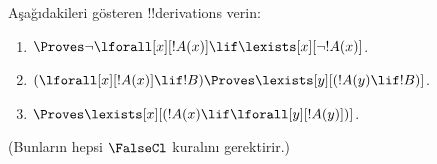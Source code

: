 \begin{prob}
Aşağıdakileri gösteren !!{derivation}s verin:
\begin{enumerate}
\item $\Proves \lnot\lforall[x][!A(x)] \lif \lexists[x][\lnot!A(x)]$.
\item $(\lforall[x][!A(x)] \lif !B) \Proves \lexists[y][(!A(y) \lif !B)]$.
\item $\Proves \lexists[x][(!A(x) \lif \lforall[y][!A(y)])]$.
\end{enumerate}
(Bunların hepsi $\FalseCl$ kuralını gerektirir.)
\end{prob}

